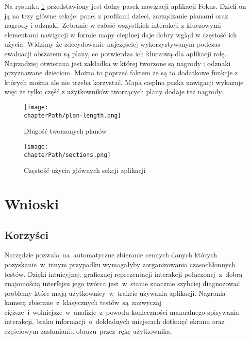 Na rysunku \ref{fig:sections_usage} przedstawiony jest dolny pasek nawigacji aplikacji Fokus. Dzieli on ją na trzy główne sekcje: panel z profilami dzieci, zarządzanie planami oraz nagrody i odznaki. Zebranie w całość wszystkich interakcji z kluczowymi elementami nawigacji w formie mapy cieplnej daje dobry wgląd w częstość ich użycia. Widzimy że zdecydowanie najczęściej wykorzystywanym podczas ewaluacji obszarem są plany, co potwierdza ich kluczową dla aplikacji rolę. Najrzadziej otwierana jest zakładka w której tworzone są nagrody i odznaki przyznawane dzieciom. Można to poprzeć faktem że są to dodatkowe funkcje z których można ale nie trzeba korzystać. Mapa cieplna paska nawigacji wykazuje więc że tylko część z użytkowników tworzących plany dodaje też nagrody.

\bigskip
\begin{figure}[H]
\centering
\begin{minipage}{.4\textwidth}
	\centering
	\texttt{[image: \\chapterPath/plan-length.png]}
	\bigskip
	\caption{Długość tworzonych planów}
	\label{fig:plan_length}
\end{minipage}
\begin{minipage}{.55\textwidth}
	\centering
	\texttt{[image: \\chapterPath/sections.png]}
	\bigskip
	\caption{Częstość użycia głównych sekcji aplikacji}
	\label{fig:sections_usage}
\end{minipage}
\end{figure}

\section{Wnioski}

\subsection{Korzyści} 
Narzędzie pozwala~na~automatyczne zbieranie cennych danych których pozyskanie~w~innym przypadku wymagałyby zorganizowania czasochłonnych testów. Dzięki intuicyjnej, graficznej reprezentacji interakcji połączonej~z~dobrą znajomością interfejsu jego twórca jest~w~stanie znacznie szybciej diagnozować problemy które mają użytkownicy~w~trakcie używania aplikacji. Nagrania kamerą zbierane~z~klasycznych testów~są~zazwyczaj cięższe~i~wolniejsze~w~analizie~z~powodu konieczności manualnego spisywania interakcji, braku informacji~o~dokładnych miejscach dotknięć ekranu oraz częściowym zasłanianiu obrazu~przez~rękę użytkownika. 
